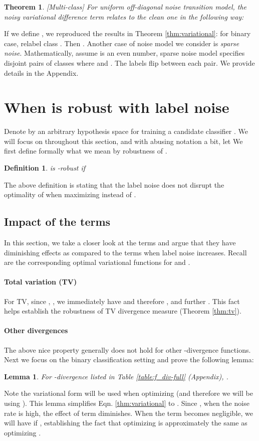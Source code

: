 \documentclass{article}
\newtheorem{theorem}{Theorem}
\newtheorem{lemma}{Lemma}
\newtheorem{definition}{Definition}
\begin{document}
\begin{theorem}\label{thm:multi1}
[Multi-class] For uniform off-diagonal noise transition model, the noisy variational difference term relates to the clean one in the following way:

\end{theorem}
If we define \underline{}, we reproduced the results in Theorem \ref{thm:variational}: for binary case, relabel class . Then . Another case of noise model we consider is \emph{sparse noise}. Mathematically, assume  is an even number, sparse noise model specifies  disjoint pairs of classes  where  and . The labels flip between each pair. We provide details in the Appendix. 
 \section{When  is robust with label noise}

Denote by  an arbitrary hypothesis space for training a candidate classifier . We will focus on  throughout this section, and with abusing notation a bit, let  
We first define formally what we mean by robustness of . 
\begin{definition}
 is -robust if 

\end{definition}
The above definition is stating that the label noise does not disrupt the optimality of  when maximizing  instead of .


\subsection{Impact of the  terms}\label{sec:bias}
In this section, we take a closer look at the  terms and argue that they have diminishing effects as compared to the  terms when label noise increases. Recall  are the corresponding optimal variational functions for  and .
\paragraph{Total variation (TV)}
For TV, since  , , we immediately have 
\underline{} 
and therefore , and further . This fact helps establish the robustness of TV divergence measure (Theorem \ref{thm:tv}).


\paragraph{Other divergences} The above nice property generally does not hold for other -divergence functions. Next we focus on the binary classification setting and prove the following lemma:
\begin{lemma}
\label{lm: bias}
For -divergence listed in Table \ref{table:f_div-full} (Appendix), .
\end{lemma}
\vspace{-0.05in}
Note the variational form will be used when optimizing   (and therefore we will be using ). This lemma simplifies Eqn. \ref{thm:variational} to .
Since , when the noise rate  is high, the effect of  term diminishes. When the  term becomes negligible, we will have  if , establishing the fact that optimizing  is approximately the same as optimizing .
\end{document}
